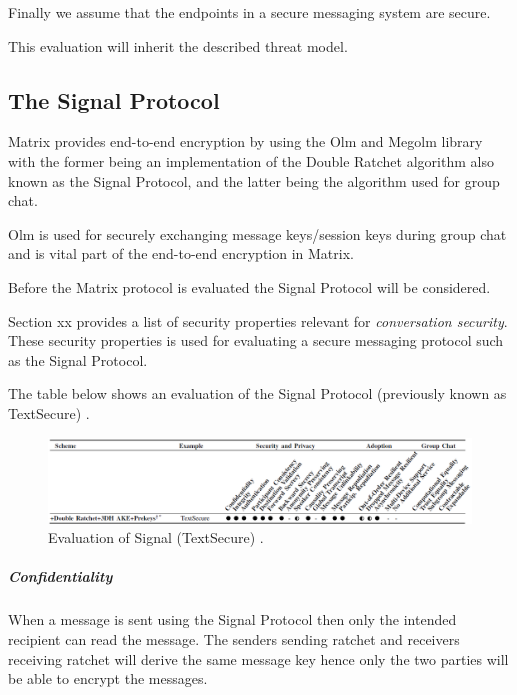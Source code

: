 Finally we assume that the endpoints in a secure messaging system are secure.

This evaluation will inherit the described threat model.

\subsection{The Signal Protocol}
Matrix provides end-to-end encryption by using the Olm and Megolm library with the former being an implementation of the Double Ratchet algorithm also known as the Signal Protocol, and the latter being the algorithm used for group chat. 

Olm is used for securely exchanging message keys/session keys during group chat and is vital part of the end-to-end encryption in Matrix.

Before the Matrix protocol is evaluated the Signal Protocol will be considered. 

Section xx provides a list of security properties relevant for \emph{conversation security}. These security properties is used for evaluating a secure messaging protocol such as the Signal Protocol.

The table below shows an evaluation of the Signal Protocol (previously known as TextSecure) \cite{sok}. 

\begin{figure}[H]
	\hspace*{-1.7cm} 
	\centering
	\includegraphics[width=16cm]{figures/framework_signal.png}
	\caption{Evaluation of Signal (TextSecure) \cite{sok}.}
	\label{fig:framework_signal}
\end{figure}




\subparagraph{Confidentiality} When a message is sent using the Signal Protocol then only the intended recipient can read the message. The senders sending ratchet and receivers receiving ratchet will derive the same message key hence only the two parties will be able to encrypt the messages. 

